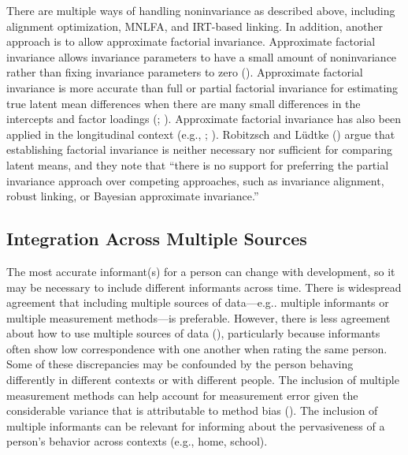 \documentclass[
  american,
  letterpaper,
  12pt]{article}
\begin{document}
There are multiple ways of handling noninvariance as described above,
including alignment optimization, MNLFA, and IRT-based linking. In
addition, another approach is to allow approximate factorial invariance.
Approximate factorial invariance allows invariance parameters to have a
small amount of noninvariance rather than fixing invariance parameters
to zero ().
Approximate factorial invariance is more accurate than full or partial
factorial invariance for estimating true latent mean differences when
there are many small differences in the intercepts and factor loadings
(;
). Approximate
factorial invariance has also been applied in the longitudinal context
(e.g., ;
). Robitzsch and
Lüdtke () argue that
establishing factorial invariance is neither necessary nor sufficient
for comparing latent means, and they note that ``there is no support for
preferring the partial invariance approach over competing approaches,
such as invariance alignment, robust linking, or Bayesian approximate
invariance.''

\subsection{Integration Across Multiple
Sources}\label{integration-across-multiple-sources}

The most accurate informant(s) for a person can change with development,
so it may be necessary to include different informants across time.
There is widespread agreement that including multiple sources of
data---e.g.. multiple informants or multiple measurement methods---is
preferable. However, there is less agreement about how to use multiple
sources of data (),
particularly because informants often show low correspondence with one
another when rating the same person. Some of these discrepancies may be
confounded by the person behaving differently in different contexts or
with different people. The inclusion of multiple measurement methods can
help account for measurement error given the considerable variance that
is attributable to method bias (). The inclusion of multiple informants can be relevant for
informing about the pervasiveness of a person's behavior across contexts
(e.g., home, school).
\end{document}
